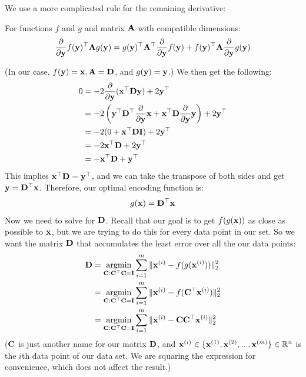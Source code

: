 We use a more complicated rule for the remaining derivative:
\begin{theorem}
    For functions $f$ and $g$ and matrix $\MA$ with compatible dimensions:
    $$\frac{\partial}{\partial\vy}f(\vy)^\top\MA g(\vy) = g(\vy)^\top\MA^\top\frac{\partial}{\partial\vy}f(\vy) + f(\vy)^\top\MA\frac{\partial}{\partial\vy}g(\vy)$$
\end{theorem}
(In our case, $f(\vy) = \vx, \MA = \MD$, and $g(\vy) = \vy$.)
We then get the following:
\begin{align*}
0 &= -2\frac{\partial}{\partial\vy}(\vx^\top\MD\vy) + 2\vy^\top \\
&= -2\left(\vy^\top\MD^\top\frac{\partial}{\partial\vy}\vx + \vx^\top\MD\frac{\partial}{\partial\vy}\vy\right) + 2\vy^\top\\
&= -2(0 + \vx^\top\MD\MI) + 2\vy^\top\\
&= -2\vx^\top\MD + 2\vy^\top\\
&= -\vx^\top\MD + \vy^\top
\end{align*}
This implies $\vx^\top\MD = \vy^\top$, and we can take the transpose of both sides and get $\vy = \MD^\top\vx$.  Therefore, our optimal encoding function is:
$$g(\vx) = \MD^\top\vx$$
Now we need to solve for $\MD$.
Recall that our goal is to get $f(g(\vx))$ as close as possible to $\vx$, but we are trying to do this for every data point in our set.  So we want the matrix $\MD$ that accumulates the least error over all the our data points:
\begin{align*}
    \MD &= \underset{\MC : \MC^\top\MC = \MI}{\argmin} \sum^m_{i=1} \|\vx^{(i)} - f(g(\vx^{(i)}))\|^2_2\\
&= \underset{\MC : \MC^\top\MC = \MI}{\argmin} \sum^m_{i=1} \|\vx^{(i)} - f(\MC^\top\vx^{(i)})\|^2_2\\
&= \underset{\MC : \MC^\top\MC = \MI}{\argmin} \sum^m_{i=1} \|\vx^{(i)} - \MC\MC^\top\vx^{(i)}\|^2_2\\
\end{align*}
($\MC$ is just another name for our matrix $\MD$, and $\vx^{(i)} \in \{\vx^{(1)}, \vx^{(2)}, ..., \vx^{(m)} \} \in \R^n$ is the $i$th data point of our data set.  We are squaring the expression for convenience, which does not affect the result.)

